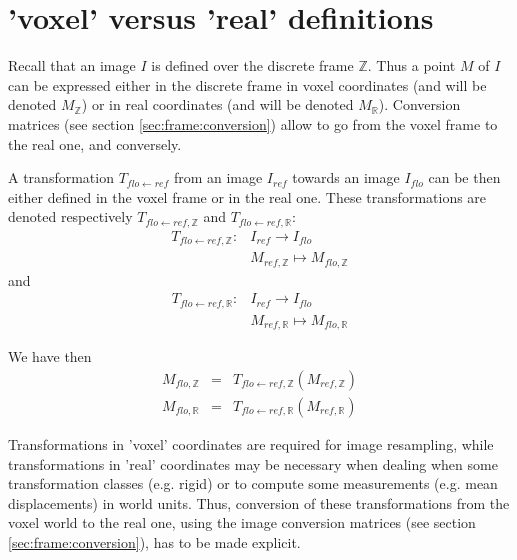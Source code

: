 \section{'voxel' versus 'real' definitions}


Recall that an image $I$ is defined over the discrete frame $\mathbb{Z}$. Thus a point $M$ of $I$ can be expressed either in the discrete frame in voxel coordinates (and will be denoted $M_{\mathbb{Z}}$) or in real coordinates (and will be denoted $M_{\mathbb{R}}$). Conversion matrices (see section \ref{sec:frame:conversion}) allow to go from the voxel frame to the real one, and conversely.

A transformation $T_{flo \leftarrow ref}$ from an image $I_{ref}$ towards an image $I_{flo}$ can be then either defined in the voxel frame or in the real one. These transformations are denoted respectively $T_{flo \leftarrow ref,\mathbb{Z}}$ and $T_{flo \leftarrow ref,\mathbb{R}}$:
\begin{displaymath}
\begin{array}{ll}
T_{flo \leftarrow ref,\mathbb{Z}}: &
I_{ref} \rightarrow I_{flo}\\
& M_{ref,\mathbb{Z}} \mapsto M_{flo,\mathbb{Z}}
\end{array}
\end{displaymath}
and
\begin{displaymath}
\begin{array}{ll}
T_{flo \leftarrow ref,\mathbb{R}}: &
I_{ref} \rightarrow I_{flo}\\
& M_{ref,\mathbb{R}} \mapsto M_{flo,\mathbb{R}}
\end{array}
\end{displaymath}

We have then 
\begin{eqnarray*}
M_{flo,\mathbb{Z}} & = & 
T_{flo \leftarrow ref,\mathbb{Z}}(M_{ref,\mathbb{Z}}) \\
M_{flo,\mathbb{R}} & = & 
T_{flo \leftarrow ref,\mathbb{R}}(M_{ref,\mathbb{R}})
\end{eqnarray*}

Transformations in 'voxel' coordinates are required for image resampling, while transformations in 'real' coordinates may be necessary when dealing when some transformation classes (e.g. rigid) or to compute some measurements (e.g. mean displacements) in world units. Thus, conversion of these transformations from the voxel world to the real one, using the image conversion matrices (see section \ref{sec:frame:conversion}), has to be made explicit.

